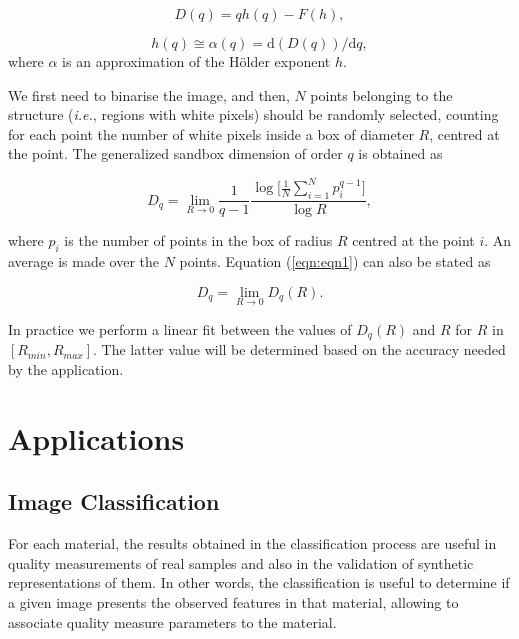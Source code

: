 \documentclass[oneside,a4paper,english,links,12pt]{article}
\begin{document}
\begin{equation}
D(q) = q h(q) - F(h),
\label{eqn:eqnLeg1}
\end{equation}

\begin{equation}
h(q) \cong \alpha(q) = \mathrm{d}(D(q))/\mathrm{d}q,
\label{eqn:eqnLeg2}
\end{equation}
where $\alpha$ is an approximation of the H\"older exponent $h$.

We first need to binarise the image, and then, $N$ points belonging to the structure ({\em i.e.}, regions with white pixels) should be randomly selected, counting for each point the number of white pixels inside a box of diameter $R$, centred at the point. The generalized sandbox dimension of order $q$ is obtained as \cite{Bert94}

\begin{equation}
D_{q} = \lim_{R\rightarrow0}{\frac{1}{q-1} \frac{\log \bigg \lbrack\frac{1}{N}\displaystyle \sum_{i=1}^{N}{p_{i}^{q-1}}\bigg \rbrack}{\log R}},
\label{eqn:eqn1}
\end{equation}

where $p_{i}$ is the number of points in the box of radius $R$ centred at the point $i$. An average is made over the $N$ points. Equation (\ref{eqn:eqn1}) can also be stated as

\begin{equation}
D_{q} = \lim_{R\rightarrow0}{D_{q}(R)}.
\end{equation}

In practice we perform a linear fit between the values of $D_{q}(R)$ and $R$ for $R$ in $[R_{min}, R_{max}]$. The latter value will be determined based on the accuracy needed by the application.


\section{Applications}

\subsection{Image Classification}
For each material, the results obtained in the classification process are useful in quality measurements of real samples and also in the validation of synthetic representations of them. In other words, the classification is useful to determine if a given image presents the observed features in that material, allowing to associate quality measure parameters to the material.
\end{document}

